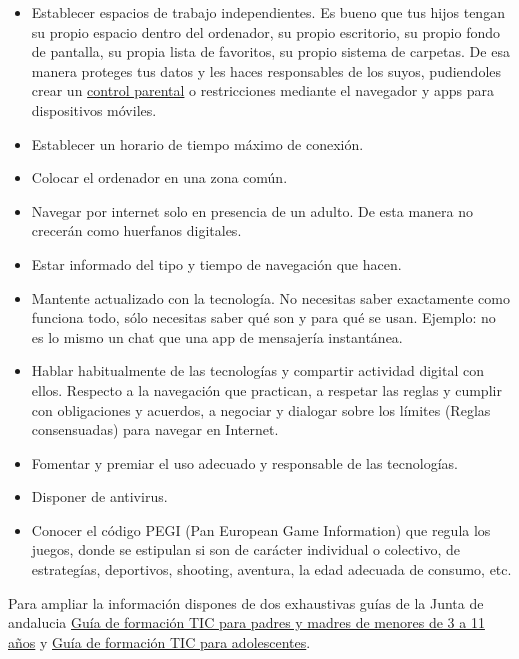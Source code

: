 \documentclass[
  spanish,
  a4paper,
  openany]{book}
\begin{document}
\begin{itemize}
\item
  Establecer espacios de trabajo independientes. Es bueno que tus hijos tengan su propio espacio dentro del ordenador, su propio escritorio, su propio fondo de pantalla, su propia lista de favoritos, su propio sistema de carpetas. De esa manera proteges tus datos y les haces responsables de los suyos, pudiendoles crear un \href{https://securekids.es/que-es-el-control-parental-y-para-que-sirve/}{control parental} o restricciones mediante el navegador y apps para dispositivos móviles.
\item
  Establecer un horario de tiempo máximo de conexión.
\item
  Colocar el ordenador en una zona común.
\item
  Navegar por internet solo en presencia de un adulto. De esta manera no crecerán como huerfanos digitales.
\item
  Estar informado del tipo y tiempo de navegación que hacen.
\item
  Mantente actualizado con la tecnología. No necesitas saber exactamente como funciona todo, sólo necesitas saber qué son y para qué se usan. Ejemplo: no es lo mismo un chat que una app de mensajería instantánea.
\item
  Hablar habitualmente de las tecnologías y compartir actividad digital con ellos. Respecto a la navegación que practican, a respetar las reglas y cumplir con obligaciones y acuerdos, a negociar y dialogar sobre los límites (Reglas consensuadas) para navegar en Internet.
\item
  Fomentar y premiar el uso adecuado y responsable de las tecnologías.
\item
  Disponer de antivirus.
\item
  Conocer el código PEGI (Pan European Game Information) que regula los juegos, donde se estipulan si son de carácter individual o colectivo, de estrategías, deportivos, shooting, aventura, la edad adecuada de consumo, etc.
\end{itemize}

Para ampliar la información dispones de dos exhaustivas guías de la Junta de andalucia \href{https://www.andaluciaesdigital.es/documents/20182/28716/Educar+para+Proteger+-+Guía+resumida+de+formación+TIC+para+padres+y+madres+de+niños+de+3+a+11+años.pdf}{Guía de formación TIC para padres y madres de menores de 3 a 11 años} y \href{https://www.juntadeandalucia.es/educacion/portalaverroes/documents/10306/1673096/Educar_para_proteger_Guia_Adolescentes.pdf}{Guía de formación TIC para adolescentes}.
\end{document}
